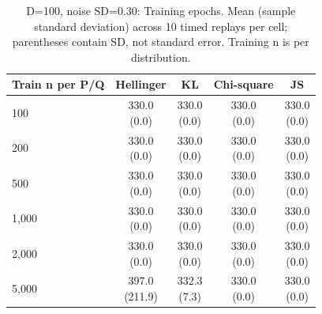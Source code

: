 \begin{table}[t]
\centering
\small
\setlength{\tabcolsep}{4pt}
\caption{D=100, noise SD=0.30: Training epochs. Mean (sample standard deviation) across 10 timed replays per cell; parentheses contain SD, not standard error. Training n is per distribution.}
\label{tab:sim-d-100-noise-sd-0-30-training-epochs}
\begin{tabular}{lcccc}
\toprule
Train n per P/Q & Hellinger & KL & Chi-square & JS \\
\midrule
100 & \shortstack{330.0\\(0.0)} & \shortstack{330.0\\(0.0)} & \shortstack{330.0\\(0.0)} & \shortstack{330.0\\(0.0)} \\
200 & \shortstack{330.0\\(0.0)} & \shortstack{330.0\\(0.0)} & \shortstack{330.0\\(0.0)} & \shortstack{330.0\\(0.0)} \\
500 & \shortstack{330.0\\(0.0)} & \shortstack{330.0\\(0.0)} & \shortstack{330.0\\(0.0)} & \shortstack{330.0\\(0.0)} \\
1,000 & \shortstack{330.0\\(0.0)} & \shortstack{330.0\\(0.0)} & \shortstack{330.0\\(0.0)} & \shortstack{330.0\\(0.0)} \\
2,000 & \shortstack{330.0\\(0.0)} & \shortstack{330.0\\(0.0)} & \shortstack{330.0\\(0.0)} & \shortstack{330.0\\(0.0)} \\
5,000 & \shortstack{397.0\\(211.9)} & \shortstack{332.3\\(7.3)} & \shortstack{330.0\\(0.0)} & \shortstack{330.0\\(0.0)} \\
\bottomrule
\end{tabular}
\end{table}

